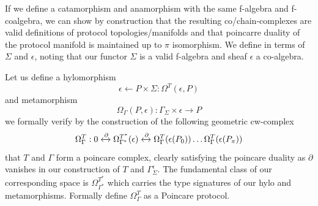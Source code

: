 \documentclass[runningheads]{llncs}
\begin{document}
If we define a catamorphism and anamorphism with the same f-algebra and f-coalgebra, we can show by construction that the resulting co/chain-complexes are valid definitions of protocol topologies/manifolds and that poincarre duality of the protocol manifold is maintained up to $\pi$ isomorphism. We define in terms of $\Sigma$ and $\epsilon$, noting that our functor $\Sigma$ is a valid f-algebra and sheaf $\epsilon$ a co-algebra.

Let us define a hylomorphism
\begin{equation}
\epsilon \leftarrow P \times \Sigma  : \Omega^T(\epsilon, P)
\end{equation}
and metamorphism
\begin{equation}
\Omega_\Gamma(P, \epsilon):\Gamma_\Sigma \times \epsilon \rightarrow P  
\end{equation} 
we formally verify by the construction of the following geometric cw-complex
\begin{equation}
\Omega^T_\Gamma: 0 \xleftrightarrow{\partial} \Omega^{T^*}_{\Gamma^*}(\epsilon) \xleftrightarrow{\partial} \Omega^T_\Gamma (\epsilon(P_0)) \dots \Omega^T_\Gamma (\epsilon(P_\pi))
\end{equation}
that $T$ and $\Gamma$ form a poincare complex, clearly satisfying the poincare duality as $\partial$ vanishes in our construction of $T$ and $\Gamma^\epsilon_\Sigma$. The fundamental class of our corresponding space is $\Omega^{T^*}_{\Gamma^*}$ which carries the type signatures of our hylo and metamorphisms. Formally define $\Omega^{T}_{\Gamma}$ as a Poincare protocol.
\end{document}
